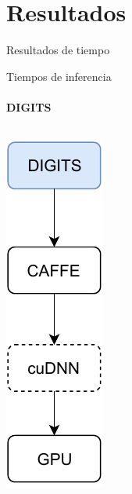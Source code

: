 \section{Resultados}

\begin{frame}
\centering
\huge
Resultados de tiempo 
    
\end{frame}

\begin{frame}{Tiempos de inferencia}

\framesubtitle{DIGITS}
	\begin{columns}
 \includegraphics[width=1\textwidth]{diagrama/frame1.pdf}
        

\end{columns}
\end{frame}
